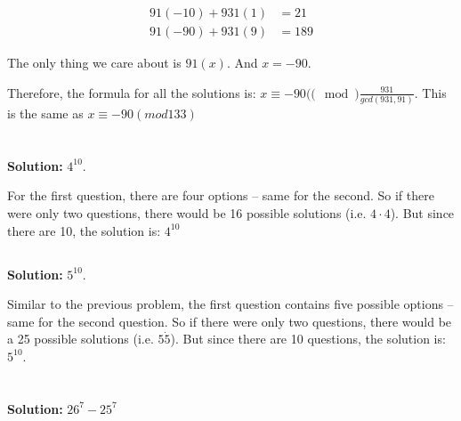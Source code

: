 \documentclass{article}
\begin{document}
\begin{align*}
    91(-10) + 931(1) &= 21 \\
    91(-90) + 931(9) &= 189
\end{align*}

The only thing we care about is $91(x)$. And $x = -90$.

Therefore, the formula for all the solutions is: $x \equiv -90 ((\mod)\frac{931}{gcd(931,91)}$. This is the same as $x \equiv -90 (mod 133)$

\newpage

\section{}


\subsection{}


\textbf{Solution: } $4^{10}$.

For the first question, there are four options -- same for the second. So if there were only two questions, there would be 16 possible solutions (i.e. $4 \cdot 4$). But since there are 10, the solution is: $4^{10}$

\subsection{}

\textbf{Solution: } $5^{10}$.

Similar to the previous problem, the first question contains five possible options -- same for the second question. So if there were only two questions, there would be a 25 possible solutions (i.e. $5 \dot 5$). But since there are 10 questions, the solution is: $5^{10}$.

\section{}

\subsection{}

\textbf{Solution: } $26^7 - 25^7$
\end{document}
